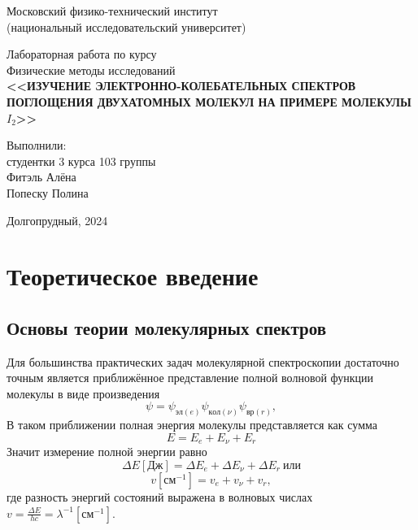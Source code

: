 \documentclass{article}
\begin{document}
\begin{titlepage}
     \begin{center}
     \large Московский физико-технический институт\\
    (национальный исследовательский университет)\\
    \vspace{2cm}
    
    \Large Лабораторная работа по курсу  \\  Физические методы исследований\\
    \vspace{2cm}
    { \Huge\bfseries <<ИЗУЧЕНИЕ ЭЛЕКТРОННО-КОЛЕБАТЕЛЬНЫХ СПЕКТРОВ ПОГЛОЩЕНИЯ ДВУХАТОМНЫХ МОЛЕКУЛ НА ПРИМЕРЕ МОЛЕКУЛЫ   $I_2$>> \\ [0.4cm] }
    
     \end{center}
    \vspace{5cm}
    {\par \raggedleft \large Выполнили:\\ студентки 3 курса
    103 группы\\Фитэль Алёна\\ Попеску Полина \par}
    \vspace{3cm}
    \begin{center}
        Долгопрудный, 2024
    \end{center}
\end{titlepage}
\section{Теоретическое введение} 
\subsection{Основы теории молекулярных спектров}
Для большинства практических задач молекулярной спектроскопии достаточно точным является приближённое представление полной волновой функции молекулы в виде произведения
\begin{equation*}
\psi = \psi_{эл(e)} \psi_{кол(\nu)} \psi_{вр(r)},
\end{equation*}
В таком приближении полная энергия молекулы представляется как сумма
\begin{equation*}
E = E_e+ E_{\nu}+E_{r} 
\end{equation*}
Значит измерение полной энергии равно 
\begin{equation*}\Delta E[Дж] = \Delta E_{e} + \Delta E_{\nu} + \Delta E_{r}~ или \end{equation*}
\begin{equation*}v[см^{-1}] =  v_{e} +  v_{\nu} +  v_{r}, \end{equation*}
где разность энергий состояний выражена в волновых числах $v = \frac{\Delta E}{hc} = \lambda^{-1}[см^{-1}]$.
\end{document}
